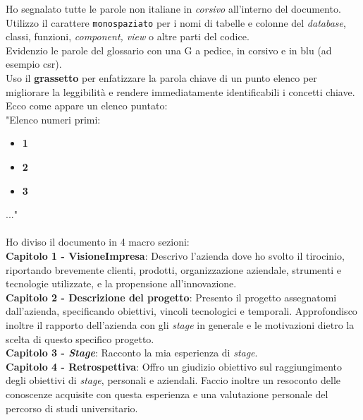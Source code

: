 Ho segnalato tutte le parole non italiane in \textit{corsivo} all'interno del documento.\\
Utilizzo il carattere \texttt{monospaziato} per i nomi di tabelle e colonne del \textit{database}, 
classi, funzioni, \textit{component, view} o altre parti del codice.\\
Evidenzio le parole del glossario con una G a pedice, in corsivo e in blu (ad esempio \gls{csr}).\\
Uso il \textbf{grassetto} per enfatizzare la parola chiave di un punto elenco 
per migliorare la leggibilità e rendere immediatamente identificabili i concetti chiave.\\
Ecco come appare un elenco puntato:\\
"Elenco numeri primi:
\begin{itemize}
\item \textbf{1}
\item \textbf{2}
\item \textbf{3}
\end{itemize}
..."\\\\
Ho diviso il documento in 4 macro sezioni:\\
\textbf{Capitolo 1 - VisioneImpresa}: Descrivo l'azienda dove ho svolto il tirocinio, riportando brevemente clienti, 
prodotti, organizzazione aziendale, strumenti e tecnologie utilizzate, e la propensione all'innovazione.\\
\textbf{Capitolo 2 - Descrizione del progetto}: Presento il progetto assegnatomi dall'azienda, specificando 
obiettivi, vincoli tecnologici e temporali. Approfondisco inoltre il rapporto dell'azienda con gli \textit{stage} in generale e 
le motivazioni dietro la scelta di questo specifico progetto.\\
\textbf{Capitolo 3 - \textit{Stage}}: Racconto la mia esperienza di \textit{stage}.\\
\textbf{Capitolo 4 - Retrospettiva}: Offro un giudizio obiettivo sul raggiungimento degli obiettivi di \textit{stage}, 
personali e aziendali. Faccio inoltre un resoconto delle conoscenze acquisite con questa esperienza e una valutazione 
personale del percorso di studi universitario.

\endgroup
\vfill
